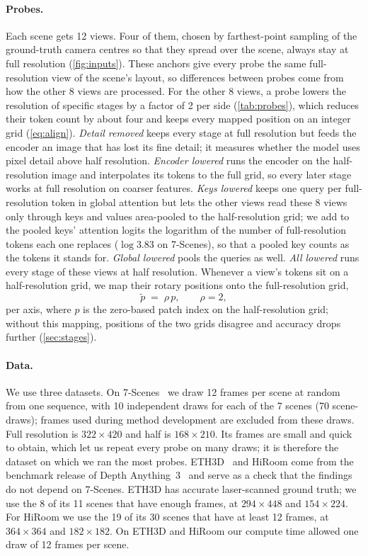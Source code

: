 \paragraph{Probes.}
Each scene gets 12 views. Four of them, chosen by farthest-point sampling of the ground-truth camera centres so that they spread over the scene, always stay at full resolution (\cref{fig:inputs}). These anchors give every probe the same full-resolution view of the scene's layout, so differences between probes come from how the other 8 views are processed. For the other 8 views, a probe lowers the resolution of specific stages by a factor of 2 per side (\cref{tab:probes}), which reduces their token count by about four and keeps every mapped position on an integer grid (\cref{eq:align}). \emph{Detail removed} keeps every stage at full resolution but feeds the encoder an image that has lost its fine detail; it measures whether the model uses pixel detail above half resolution. \emph{Encoder lowered} runs the encoder on the half-resolution image and interpolates its tokens to the full grid, so every later stage works at full resolution on coarser features. \emph{Keys lowered} keeps one query per full-resolution token in global attention but lets the other views read these 8 views only through keys and values area-pooled to the half-resolution grid; we add to the pooled keys' attention logits the logarithm of the number of full-resolution tokens each one replaces ($\log 3.83$ on 7-Scenes), so that a pooled key counts as the tokens it stands for. \emph{Global lowered} pools the queries as well. \emph{All lowered} runs every stage of these views at half resolution. Whenever a view's tokens sit on a half-resolution grid, we map their rotary positions onto the full-resolution grid,
\begin{equation}
  \tilde p \;=\; \rho\, p, \qquad \rho = 2,
  \label{eq:align}
\end{equation}
per axis, where $p$ is the zero-based patch index on the half-resolution grid; without this mapping, positions of the two grids disagree and accuracy drops further (\cref{sec:stages}).

\paragraph{Data.}
We use three datasets. On 7-Scenes~\cite{shotton2013scene} we draw 12 frames per scene at random from one sequence, with 10 independent draws for each of the 7 scenes (70 scene-draws); frames used during method development are excluded from these draws. Full resolution is $322{\times}420$ and half is $168{\times}210$. Its frames are small and quick to obtain, which let us repeat every probe on many draws; it is therefore the dataset on which we ran the most probes. ETH3D~\cite{schops2017eth3d} and HiRoom come from the benchmark release of Depth Anything~3~\cite{lin2025da3} and serve as a check that the findings do not depend on 7-Scenes. ETH3D has accurate laser-scanned ground truth; we use the 8 of its 11 scenes that have enough frames, at $294{\times}448$ and $154{\times}224$. For HiRoom we use the 19 of its 30 scenes that have at least 12 frames, at $364{\times}364$ and $182{\times}182$. On ETH3D and HiRoom our compute time allowed one draw of 12 frames per scene.

